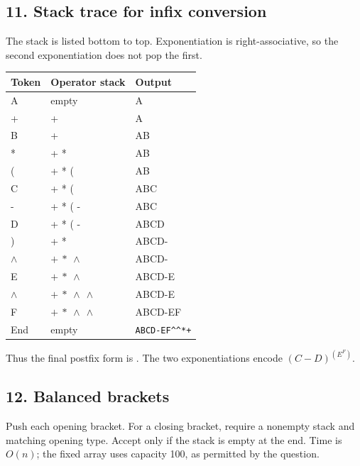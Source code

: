 \documentclass[11pt,a4paper]{article}
\begin{document}
\noindent\begin{minipage}{\linewidth}\subsection*{11. Stack trace for infix conversion}
The stack is listed bottom to top. Exponentiation is right-associative, so the second exponentiation does not pop the first.\begin{center}\renewcommand{\arraystretch}{1.2}\begin{tabular}{lll}\hline Token & Operator stack & Output\\\hline
A & empty & A\\
+ & + & A\\
B & + & AB\\
* & + * & AB\\
( & + * ( & AB\\
C & + * ( & ABC\\
- & + * ( - & ABC\\
D & + * ( - & ABCD\\
) & + * & ABCD-\\
$\wedge$ & $+\ *\ \wedge$ & ABCD-\\
E & $+\ *\ \wedge$ & ABCD-E\\
$\wedge$ & $+\ *\ \wedge\ \wedge$ & ABCD-E\\
F & $+\ *\ \wedge\ \wedge$ & ABCD-EF\\
End & empty & \texttt{ABCD-EF\^{}\^{}*+}\\\hline\end{tabular}\end{center}Thus the final postfix form is . The two exponentiations encode $(C-D)^{(E^F)}$.
\end{minipage}\par\medskip
\noindent\begin{minipage}{\linewidth}\subsection*{12. Balanced brackets}
Push each opening bracket. For a closing bracket, require a nonempty stack and matching opening type. Accept only if the stack is empty at the end. Time is $O(n)$; the fixed array uses capacity 100, as permitted by the question.

\end{minipage}\par\medskip
\end{document}
